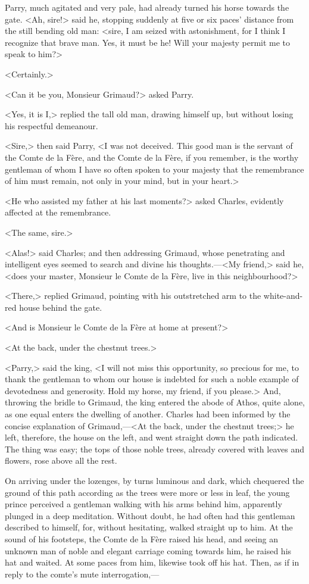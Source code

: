 Parry, much agitated and very pale, had already turned his horse towards the gate. <Ah, sire!> said he, stopping suddenly at five or six paces' distance from the still bending old man: <sire, I am seized with astonishment, for I think I recognize that brave man. Yes, it must be he! Will your majesty permit me to speak to him?>

<Certainly.>

<Can it be you, Monsieur Grimaud?> asked Parry.

<Yes, it is I,> replied the tall old man, drawing himself up, but without losing his respectful demeanour.

<Sire,> then said Parry, <I was not deceived. This good man is the servant of the Comte de la Fère, and the Comte de la Fère, if you remember, is the worthy gentleman of whom I have so often spoken to your majesty that the remembrance of him must remain, not only in your mind, but in your heart.>

<He who assisted my father at his last moments?> asked Charles, evidently affected at the remembrance.

<The same, sire.>

<Alas!> said Charles; and then addressing Grimaud, whose penetrating and intelligent eyes seemed to search and divine his thoughts.—<My friend,> said he, <does your master, Monsieur le Comte de la Fère, live in this neighbourhood?>

<There,> replied Grimaud, pointing with his outstretched arm to the white-and-red house behind the gate.

<And is Monsieur le Comte de la Fère at home at present?>

<At the back, under the chestnut trees.>

<Parry,> said the king, <I will not miss this opportunity, so precious for me, to thank the gentleman to whom our house is indebted for such a noble example of devotedness and generosity. Hold my horse, my friend, if you please.> And, throwing the bridle to Grimaud, the king entered the abode of Athos, quite alone, as one equal enters the dwelling of another. Charles had been informed by the concise explanation of Grimaud,—<At the back, under the chestnut trees;> he left, therefore, the house on the left, and went straight down the path indicated. The thing was easy; the tops of those noble trees, already covered with leaves and flowers, rose above all the rest.

On arriving under the lozenges, by turns luminous and dark, which chequered the ground of this path according as the trees were more or less in leaf, the young prince perceived a gentleman walking with his arms behind him, apparently plunged in a deep meditation. Without doubt, he had often had this gentleman described to himself, for, without hesitating,  walked straight up to him. At the sound of his footsteps, the Comte de la Fère raised his head, and seeing an unknown man of noble and elegant carriage coming towards him, he raised his hat and waited. At some paces from him,  likewise took off his hat. Then, as if in reply to the comte's mute interrogation,—

